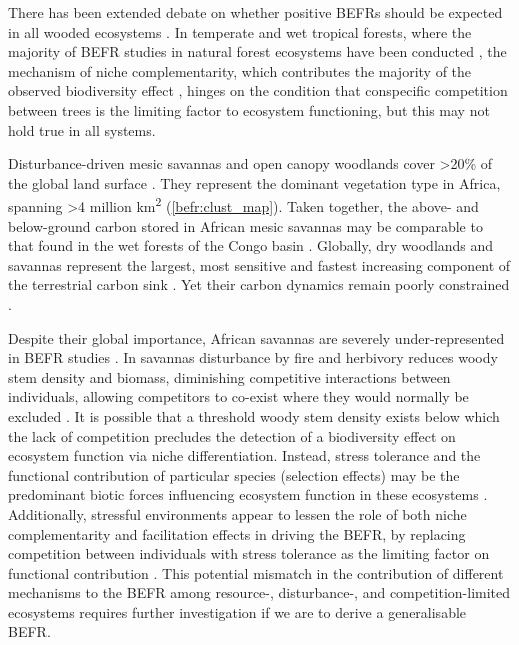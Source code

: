 \begin{refsection}
There has been extended debate on whether positive BEFRs should be expected in all wooded ecosystems \citep{Liang2016}. In temperate and wet tropical forests, where the majority of BEFR studies in natural forest ecosystems have been conducted \citep{Plas2019}, the mechanism of niche complementarity, which contributes the majority of the observed biodiversity effect \citep{Poorter2015, Sande2017a, Wright2017}, hinges on the condition that conspecific competition between trees is the limiting factor to ecosystem functioning, but this may not hold true in all systems. 

Disturbance-driven mesic savannas and open canopy woodlands cover >20\% of the global land surface \citep{Pennington2018, Solbrig1996}. They represent the dominant vegetation type in Africa, spanning >4 million km\textsuperscript{2} \citep{White1983, Ratnam2011, Ryan2016} (\autoref{befr:clust_map}). Taken together, the above- and below-ground carbon stored in African mesic savannas may be comparable to that found in the wet forests of the Congo basin \citep{Houghton2009, Mayaux2008, Spawn2020}. Globally, dry woodlands and savannas represent the largest, most sensitive and fastest increasing component of the terrestrial carbon sink \citep{Ahlstrom2015}. Yet their carbon dynamics remain poorly constrained \citep{Sitch2015}.

Despite their global importance, African savannas are severely under-represented in BEFR studies \citep{Clarke2017, Liang2016}. In savannas disturbance by fire \citep{Lehmann2014} and herbivory \citep{Sankaran2008, Levick2009} reduces woody stem density and biomass, diminishing competitive interactions between individuals, allowing competitors to co-exist where they would normally be excluded \citep{Grime1979, Grace1990}. It is possible that a threshold woody stem density exists below which the lack of competition precludes the detection of a biodiversity effect on ecosystem function via niche differentiation. Instead, stress tolerance and the functional contribution of particular species (selection effects) may be the predominant biotic forces influencing ecosystem function in these ecosystems \citep{Lasky2014, Tobner2016}. Additionally, stressful environments appear to lessen the role of both niche complementarity and facilitation effects in driving the BEFR, by replacing competition between individuals with stress tolerance as the limiting factor on functional contribution \citep{Ratcliffe2017, Paquette2010}. This potential mismatch in the contribution of different mechanisms to the BEFR among resource-, disturbance-, and competition-limited ecosystems requires further investigation if we are to derive a generalisable BEFR.


\end{refsection}
